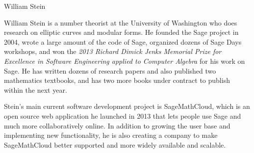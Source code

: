 \begin{participant}[type=R,PM=0,salary=9000,gender=male]{William Stein}

William Stein is a number theorist at the University of Washington
who does research on elliptic curves and modular forms.
He founded the Sage project in 2004, wrote a large
amount of the code of Sage, organized dozens of Sage Days workshops,
and won the {\em 2013 Richard Dimick Jenks
Memorial Prize for Excellence in
Software Engineering applied to Computer Algebra} for his work on Sage.
He has written dozens of research papers and
also published two mathematics textbooks, and has two more books
under contract to publish within the next year.

Stein's main current software development project is SageMathCloud,
which is an open source web application he launched in 2013
that lets people use Sage and much more collaboratively online.
In addition to growing the user base and implementing
new functionality, he is also creating a company to make
SageMathCloud better supported and
more widely available and scalable.

\end{participant}

